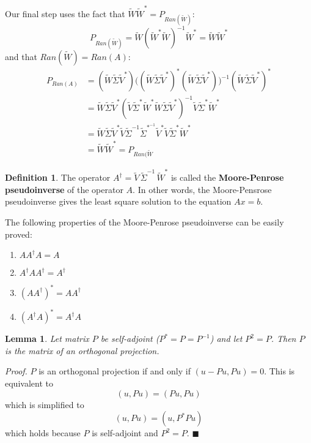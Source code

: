 \documentclass[a4paper,10pt]{book}
\theoremstyle{plain}
\theoremstyle{plain}
\newtheorem{lemma}[theorem]{Lemma}
\newenvironment{lproof}{\textsl{Proof.}}{\hfill$\blacksquare$}
\theoremstyle{definition}
\newtheorem{definition}{Definition}[section]
\begin{document}
Our final step uses the fact that $\widetilde{W} \widetilde{W}^{*} = P_{Ran(\widetilde{W})}$: 
$$P_{Ran(\widetilde{W})} = \widetilde{W} (\widetilde{W}^{*} \widetilde{W})^{-1} \widetilde{W}^{*} = \widetilde{W} \widetilde{W}^{*}$$
and that $Ran(\widetilde{W}) = Ran(A)$:
$$
\begin{aligned}
P_{Ran(A)} &= (\widetilde{W} \widetilde{\Sigma} \widetilde{V}^{*}) \big( (\widetilde{W} \widetilde{\Sigma} \widetilde{V}^{*})^{*} (\widetilde{W} \widetilde{\Sigma} \widetilde{V}^{*}) \big)^{-1} (\widetilde{W} \widetilde{\Sigma} \widetilde{V}^{*})^{*} \\
&= \widetilde{W} \widetilde{\Sigma} \widetilde{V}^{*} ( \widetilde{V} \widetilde{\Sigma}^{*} \widetilde{W}^{*} \widetilde{W} \widetilde{\Sigma} \widetilde{V}^{*} )^{-1} \widetilde{V} \widetilde{\Sigma}^{*} \widetilde{W}^{*} \\
&= \widetilde{W} \widetilde{\Sigma} \widetilde{V}^{*} \widetilde{V} \widetilde{\Sigma}^{-1} \widetilde{\Sigma}^{*^{-1}} \widetilde{V}^{*}  \widetilde{V} \widetilde{\Sigma}^{*} \widetilde{W}^{*} \\
&= \widetilde{W} \widetilde{W}^{*} = P_{Ran(\widetilde{W}}
\end{aligned}
$$

\begin{definition}
The operator $A^{\dagger} = \widetilde{V} \, \widetilde{\Sigma}^{-1} \, \widetilde{W}^{*} $ is called the \textbf{Moore-Penrose pseudoinverse} of the operator $A$. In other words, the Moore-Pensrose pseudoinverse gives the least square solution to the equation $Ax = b$. 

The following properties of the Moore-Penrose pseudoinverse can be easily proved: 
\begin{enumerate}
	\item $AA^{\dagger}A = A$
	\item $A^{\dagger} A A^{\dagger} = A^{\dagger}$
	\item $(AA^{\dagger})^{*} = AA^{\dagger}$
	\item $(A^{\dagger} A)^{*} = A^{\dagger} A$
\end{enumerate}
\end{definition}

\begin{lemma}
Let matrix $P$ be self-adjoint ($P^{*} = P = P^{-1}$) and let $P^{2} = P$. Then $P$ is the matrix of an orthogonal projection.
\end{lemma}

\begin{lproof}
$P$ is an orthogonal projection if and only if $(u - Pu, Pu) = 0$. This is equivalent to 
$$(u, Pu) = (Pu, Pu)$$
which is simplified to 
$$(u, Pu) = (u, P^{*}Pu)$$
which holds because $P$ is self-adjoint and $P^{2} = P$. 
\end{lproof}
\end{document}
